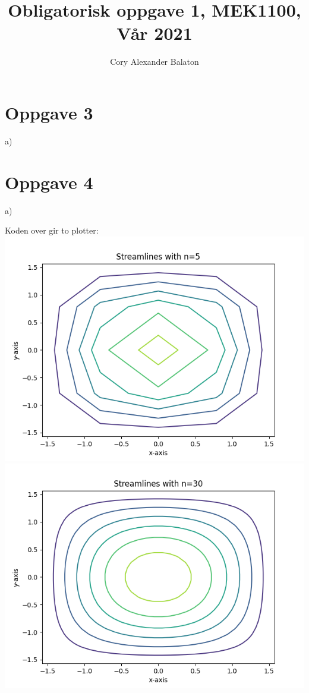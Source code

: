 \documentclass[12pt, a4paper]{article}
\title{Obligatorisk oppgave 1, MEK1100, Vår 2021}
\author{Cory Alexander Balaton}
\date{}
\begin{document}
\maketitle 
\newpage



\section*{Oppgave 3}

a)





\section*{Oppgave 4}

a)

Koden over gir to plotter: \\
\hspace*{-1.5cm}
\includegraphics[scale=0.5]{strlin_5}
\includegraphics[scale=0.5]{strlin_30}\\
\end{document}
